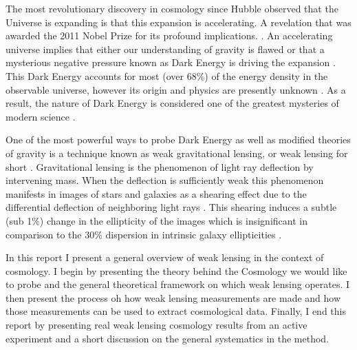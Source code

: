 The most revolutionary discovery in cosmology since 
Hubble observed that the Universe is expanding is that 
this expansion is accelerating. A revelation that was 
awarded the 2011 Nobel Prize for its profound 
implications. \cite{nobel}. An accelerating
universe implies that either our understanding of gravity is flawed 
or that a mysterious negative pressure known as Dark Energy is driving the 
expansion \cite{peebles}.
This Dark Energy accounts for most (over 68\%) of the energy density in the observable universe, 
however its origin and physics are presently unknown \cite{planck}. 
As a result, the nature of Dark Energy is considered one of the 
greatest mysteries of modern science \cite{pathfinder}.  
\par
One of the most powerful ways to probe Dark Energy as well as modified theories of gravity is a technique known as weak gravitational lensing, or weak lensing for short \cite{hoekstra,rachel_2018}. Gravitational lensing is the phenomenon of light ray deflection by intervening mass. When the deflection is sufficiently weak this phenomenon manifests in images of stars and galaxies as a shearing effect due to the differential deflection of neighboring light rays \cite{general_2013,hoekstra}. This shearing induces a subtle (sub 1\%) change in the ellipticity of the images which is insignificant in comparison to the 30\% dispersion in intrinsic galaxy ellipticities \cite{general_2013}. 
\par
In this report I present a general overview of weak lensing in the context of cosmology. I begin by presenting the theory behind the Cosmology we would like to probe and the general theoretical framework on which weak lensing operates. I then present the process oh how weak lensing measurements are made and how those measurements can be used to extract cosmological data. Finally, I end this report by presenting real weak lensing cosmology results from an active experiment and a short discussion on the general systematics in the method. 